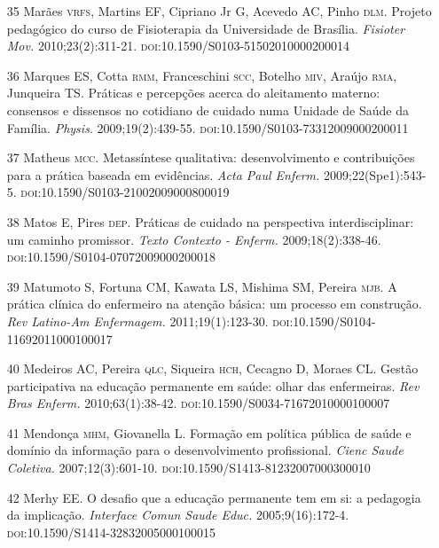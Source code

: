 \documentclass{article}
\begin{document}
\begin{itemize}
\item[35] Marães \textsc{vrfs}, Martins EF, Cipriano Jr G, Acevedo AC, Pinho \textsc{dlm}. Projeto
pedagógico do curso de Fisioterapia da Universidade de Brasília.
\textit{Fisioter Mov.}
2010;23(2):311-21. \textsc{doi}:10.1590/S0103-51502010000200014

\item[36] Marques ES, Cotta \textsc{rmm}, Franceschini \textsc{scc}, Botelho \textsc{miv}, Araújo \textsc{rma},
Junqueira TS. Práticas e percepções acerca do aleitamento materno: consensos e
dissensos no cotidiano de cuidado numa Unidade de Saúde da Família.
\textit{Physis}. 2009;19(2):439-55. \textsc{doi}:10.1590/S0103-73312009000200011

\item[37] Matheus \textsc{mcc}. Metassíntese qualitativa: desenvolvimento e contribuições
para a prática baseada em evidências. \textit{Acta Paul Enferm.}
2009;22(Spe1):543-5. \textsc{doi}:10.1590/S0103-21002009000800019

\item[38] Matos E, Pires \textsc{dep}. Práticas de cuidado na perspectiva
interdisciplinar: um caminho promissor. \textit{Texto Contexto - Enferm.}
2009;18(2):338-46. \textsc{doi}:10.1590/S0104-07072009000200018

\item[39] Matumoto S, Fortuna CM, Kawata LS, Mishima SM, Pereira \textsc{mjb}. A prática
clínica do enfermeiro na atenção básica: um processo em construção. \textit{Rev
Latino-Am Enfermagem.}
2011;19(1):123-30. \textsc{doi}:10.1590/S0104-11692011000100017

\item[40] Medeiros AC, Pereira \textsc{qlc}, Siqueira \textsc{hch}, Cecagno D, Moraes CL. Gestão
participativa na educação permanente em saúde: olhar das enfermeiras.
\textit{Rev Bras Enferm.}
2010;63(1):38-42. \textsc{doi}:10.1590/S0034-71672010000100007

\item[41] Mendonça \textsc{mhm}, Giovanella L. Formação em política pública de saúde e
domínio da informação para o desenvolvimento profissional. \textit{Cienc Saude
Coletiva.}
2007;12(3):601-10. \textsc{doi}:10.1590/S1413-81232007000300010

\item[42] Merhy EE. O desafio que a educação permanente tem em si: a pedagogia
da implicação. \textit{Interface Comun Saude Educ.}
2005;9(16):172-4. \textsc{doi}:10.1590/S1414-32832005000100015


\end{itemize}
\end{document}
